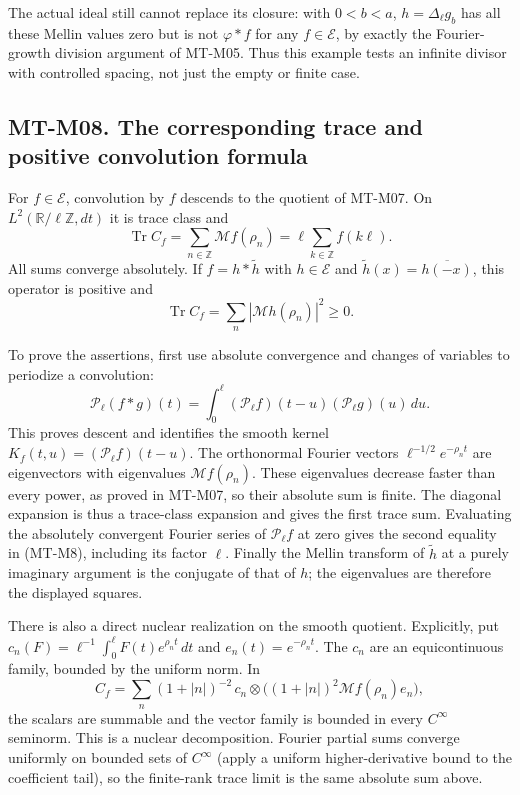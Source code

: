 The actual ideal still cannot replace its closure: with $0<b<a$,
$h=\Delta_\ell g_b$ has all these Mellin values zero but is not
$\varphi*f$ for any $f\in\mathcal E$, by exactly the Fourier-growth
division argument of MT-M05. Thus this example tests an infinite
divisor with controlled spacing, not just the empty or finite case.

\subsection*{MT-M08. The corresponding trace and positive convolution formula}
For $f\in\mathcal E$, convolution by $f$ descends to the quotient of
MT-M07. On $L^2(\mathbb R/\ell\mathbb Z,dt)$ it is trace class and
\[
 \operatorname{Tr}C_f
   =\sum_{n\in\mathbb Z}\mathcal Mf(\rho_n)
   =\ell\sum_{k\in\mathbb Z}f(k\ell).                 \tag{MT-M8}
\]
All sums converge absolutely. If
$f=h*\widetilde h$ with $h\in\mathcal E$ and
$\widetilde h(x)=\overline{h(-x)}$, this operator is positive and
\[
                  \operatorname{Tr}C_f
                   =\sum_n|\mathcal Mh(\rho_n)|^2\ge0.
\]

To prove the assertions, first use absolute convergence and changes of
variables to periodize a convolution:
\[
 \mathcal P_\ell(f*g)(t)
  =\int_0^\ell(\mathcal P_\ell f)(t-u)
                     (\mathcal P_\ell g)(u)\,du.
\]
This proves descent and identifies the smooth kernel
$K_f(t,u)=(\mathcal P_\ell f)(t-u)$.
The orthonormal Fourier vectors
$\ell^{-1/2}e^{-\rho_n t}$ are eigenvectors with eigenvalues
$\mathcal Mf(\rho_n)$. These eigenvalues decrease faster than every
power, as proved in MT-M07, so their absolute sum is finite.
The diagonal expansion is thus a trace-class expansion and gives
the first trace sum. Evaluating the absolutely convergent Fourier
series of $\mathcal P_\ell f$ at zero gives the second equality
in (MT-M8), including its factor $\ell$. Finally the Mellin transform
of $\widetilde h$ at a purely imaginary argument is the conjugate
of that of $h$; the eigenvalues are therefore the displayed squares.

There is also a direct nuclear realization on the smooth quotient.
Explicitly, put $c_n(F)=\ell^{-1}\int_0^\ell F(t)e^{\rho_nt}\,dt$
and $e_n(t)=e^{-\rho_nt}$. The $c_n$ are an equicontinuous family,
bounded by the uniform norm. In
\[
 C_f=\sum_n(1+|n|)^{-2}\,
       c_n\otimes\bigl((1+|n|)^2\mathcal Mf(\rho_n)e_n\bigr),
\]
the scalars are summable and the vector family is bounded in every
$C^\infty$ seminorm. This is a nuclear decomposition. Fourier partial
sums converge uniformly on bounded sets of $C^\infty$ (apply a
uniform higher-derivative bound to the coefficient tail), so the
finite-rank trace limit is the same absolute sum above.

